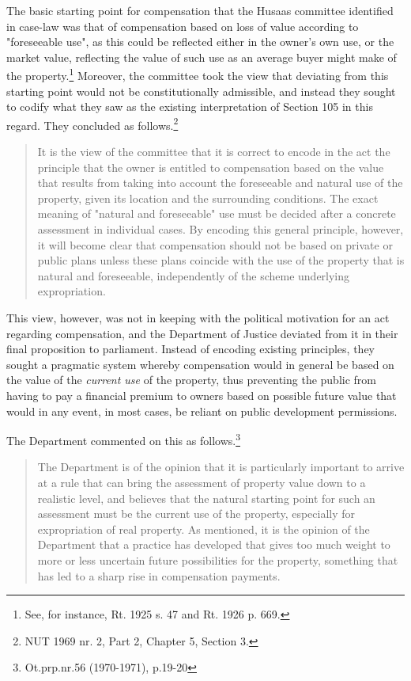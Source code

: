 \documentclass[10pt]{article} %
\begin{document}
The basic starting point for compensation that the Husaas committee identified in case-law was that of compensation based on loss of value according to "foreseeable use", as this could be reflected either in the owner's own use, or the market value, reflecting the value of such use as an average buyer might make of the property.\footnote{See, for instance, Rt. 1925 s. 47 and Rt. 1926 p. 669.} Moreover, the committee took the view that deviating from this starting point would not be constitutionally admissible, and instead they sought to codify what they saw as the existing interpretation of Section 105 in this regard. They concluded as follows.\footnote{NUT 1969 nr. 2, Part 2, Chapter 5, Section 3.}

\begin{quote}
It is the view of the committee that it is correct to encode in the act the principle that the owner is entitled to compensation based on the value that results from taking into account the foreseeable and natural use of the property, given its location and the surrounding conditions. The exact meaning of "natural and foreseeable" use must be decided after a concrete assessment in individual cases. By encoding this general principle, however, it will become clear that compensation should not be based on private or public plans unless these plans coincide with the use of the property that is natural and foreseeable, independently of the scheme underlying expropriation.
\end{quote}

This view, however, was not in keeping with the political motivation for an act regarding compensation, and the Department of Justice deviated from it in their final proposition to parliament. Instead of encoding existing  principles, they sought a pragmatic system whereby compensation would in general be based on the value of the \emph{current use} of the property, thus preventing the public from having to pay a financial premium to owners based on possible future value that would in any event, in most cases, be reliant on public development permissions. %

The Department commented on this as follows.\footnote{Ot.prp.nr.56 (1970-1971), p.19-20}

\begin{quote}
The Department is of the opinion that it is particularly important to arrive at a rule that can bring the assessment of property value down to a realistic level, and believes that the natural starting point for such an assessment must be the current use of the property, especially for expropriation of real property. As mentioned, it is the opinion of the Department that a practice has developed that gives too much weight to more or less uncertain future possibilities for the property, something that has led to a sharp rise in compensation payments.
\end{quote}
\end{document}

